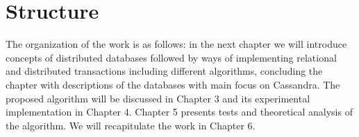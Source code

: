  
\section{Structure}\label{sec:introduction:structure}
The organization of the work is as follows: 
in the next chapter we will introduce concepts of distributed databases followed by ways of implementing relational and distributed transactions including different algorithms, concluding the chapter with descriptions of the databases with main focus on Cassandra. 
The proposed algorithm will be discussed in Chapter 3 and its experimental implementation in Chapter 4.
Chapter 5 presents tests and theoretical analysis of the algorithm.
We will recapitulate the work in Chapter 6.

